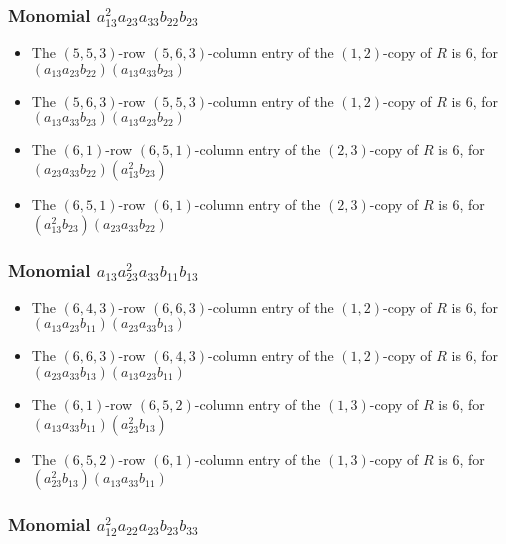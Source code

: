 \documentclass{article}
\begin{document}
\subsubsection{Monomial $ a_{13}^{2} a_{23} a_{33} b_{22} b_{23} $}

\begin{itemize}
\item The $(5, 5, 3)$-row $(5, 6, 3)$-column entry of the $ \left(1, 2\right) $-copy of $R$ is $ 6 $, for $( a_{13} a_{23} b_{22} )( a_{13} a_{33} b_{23} )$ 
\item The $(5, 6, 3)$-row $(5, 5, 3)$-column entry of the $ \left(1, 2\right) $-copy of $R$ is $ 6 $, for $( a_{13} a_{33} b_{23} )( a_{13} a_{23} b_{22} )$ 
\item The $(6, 1)$-row $(6, 5, 1)$-column entry of the $ \left(2, 3\right) $-copy of $R$ is $ 6 $, for $( a_{23} a_{33} b_{22} )( a_{13}^{2} b_{23} )$ 
\item The $(6, 5, 1)$-row $(6, 1)$-column entry of the $ \left(2, 3\right) $-copy of $R$ is $ 6 $, for $( a_{13}^{2} b_{23} )( a_{23} a_{33} b_{22} )$ 
\end{itemize}
\subsubsection{Monomial $ a_{13} a_{23}^{2} a_{33} b_{11} b_{13} $}

\begin{itemize}
\item The $(6, 4, 3)$-row $(6, 6, 3)$-column entry of the $ \left(1, 2\right) $-copy of $R$ is $ 6 $, for $( a_{13} a_{23} b_{11} )( a_{23} a_{33} b_{13} )$ 
\item The $(6, 6, 3)$-row $(6, 4, 3)$-column entry of the $ \left(1, 2\right) $-copy of $R$ is $ 6 $, for $( a_{23} a_{33} b_{13} )( a_{13} a_{23} b_{11} )$ 
\item The $(6, 1)$-row $(6, 5, 2)$-column entry of the $ \left(1, 3\right) $-copy of $R$ is $ 6 $, for $( a_{13} a_{33} b_{11} )( a_{23}^{2} b_{13} )$ 
\item The $(6, 5, 2)$-row $(6, 1)$-column entry of the $ \left(1, 3\right) $-copy of $R$ is $ 6 $, for $( a_{23}^{2} b_{13} )( a_{13} a_{33} b_{11} )$ 
\end{itemize}
\subsubsection{Monomial $ a_{12}^{2} a_{22} a_{23} b_{23} b_{33} $}
\end{document}
